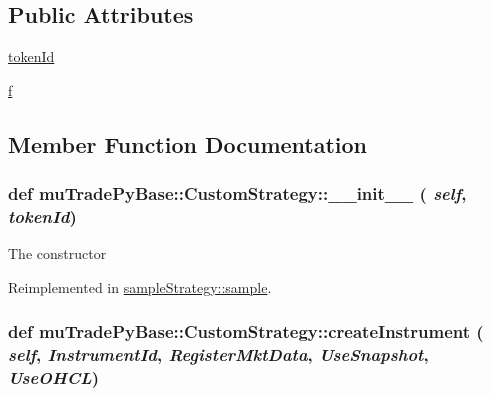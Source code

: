 \subsection*{Public Attributes}
\begin{DoxyCompactItemize}
\item 
\hyperlink{classmuTradePyBase_1_1CustomStrategy_aa800d9ce36ac2a140b0722db94ccdab9}{tokenId}
\item 
\hyperlink{classmuTradePyBase_1_1CustomStrategy_a6cd3aa3febbc8ad76120b43a7663301f}{f}
\end{DoxyCompactItemize}


\subsection{Member Function Documentation}
\hypertarget{classmuTradePyBase_1_1CustomStrategy_ac6fcdf08165af5413c9883bf68dcd23b}{
\subsubsection[{\_\-\_\-init\_\-\_\-}]{\setlength{\rightskip}{0pt plus 5cm}def muTradePyBase::CustomStrategy::\_\-\_\-init\_\-\_\- ( {\em self}, \/   {\em tokenId})}}
\label{classmuTradePyBase_1_1CustomStrategy_ac6fcdf08165af5413c9883bf68dcd23b}
\begin{DoxyVerb}The constructor\end{DoxyVerb}
 

Reimplemented in \hyperlink{classsampleStrategy_1_1sample_a9181fa2dc3d56ebe267718817dbc6941}{sampleStrategy::sample}.\hypertarget{classmuTradePyBase_1_1CustomStrategy_a71716af3dce670bfe2ec9a1d8a73afc3}{
\subsubsection[{createInstrument}]{\setlength{\rightskip}{0pt plus 5cm}def muTradePyBase::CustomStrategy::createInstrument ( {\em self}, \/   {\em InstrumentId}, \/   {\em RegisterMktData}, \/   {\em UseSnapshot}, \/   {\em UseOHCL})}}
\label{classmuTradePyBase_1_1CustomStrategy_a71716af3dce670bfe2ec9a1d8a73afc3}


